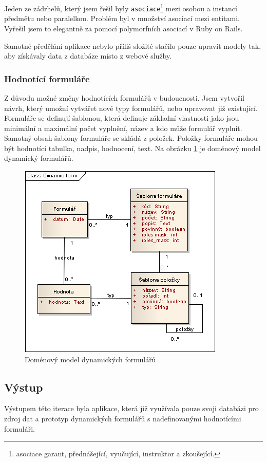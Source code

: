 Jeden ze zádrhelů, který jsem řešil byly \verb|asociace|\footnote{asociace garant, přednášející, vyučující, instruktor a zkoušející.} mezi osobou a instancí předmětu nebo paralelkou. Problém byl v množství asociací mezi entitami. Vyřešil jsem to elegantně za pomocí polymorfních asociací \cite{guide_pa} v Ruby on Rails.

Samotné předělání aplikace nebylo příliš složité stačilo pouze upravit modely tak, aby získávaly data z databáze místo z webové služby. 

\subsubsection{Hodnotící formuláře}
Z důvodu možné změny hodnotících formulářů v budoucnosti. Jsem vytvořil návrh, který umožní vytvářet nové typy formulářů, nebo upravovat již existující. Formuláře se definují šablonou, která definuje základní vlastnosti jako jsou minimální a maximální počet vyplnění, název a kdo může formulář vyplnit. Samotný obsah šablony formuláře se skládá z položek. Položky formuláře mohou být hodnotící tabulka, nadpis, hodnocení, text. Na obrázku \ref{fig:dynamicform} je doménový model dynamický formulářů.

\begin{figure}[h]
\begin{center}
\includegraphics[scale=0.7]{figures/Dynamic_form}
\caption{Doménový model dynamických formulářů}
\label{fig:dynamicform}
\end{center}
\end{figure}

\subsection{Výstup} 
Výstupem této iterace byla aplikace, která již využívala pouze svoji databázi pro zdroj dat a prototyp dynamických formulářů s nadefinovanými hodnotícími formuláři.

